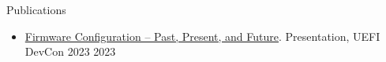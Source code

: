 \documentclass{resume} %
\begin{document}
\begin{rSection}{Publications}

\begin{itemize}
    \item \href{https://uefi.org/sites/default/files/resources/Firmware%20Configuration%20%E2%80%93%20Past%2C%20Present%2C%20and%20Future_Zimmer.pdf}{Firmware Configuration – Past, Present, and Future}. Presentation, UEFI DevCon 2023 \hfill {2023}
\end{itemize}


\end{rSection}
\end{document}
